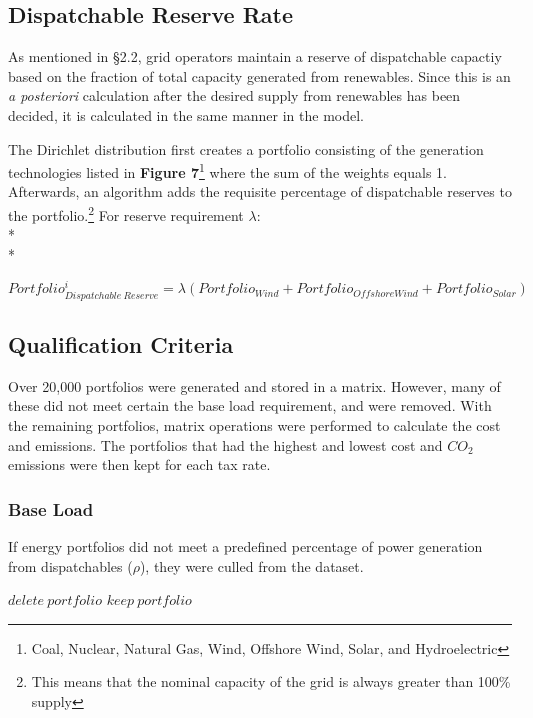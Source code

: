 \documentclass{article}
\begin{document}
\subsection{Dispatchable Reserve Rate}
As mentioned in \S{2.2}, grid operators maintain a reserve of dispatchable capactiy based on the fraction of total capacity generated from renewables. Since this is an \emph{a posteriori} calculation after the desired supply from renewables has been decided, it is calculated in the same manner in the model. \*

The Dirichlet distribution first creates a portfolio consisting of the generation technologies listed in {\bf Figure 7}\footnote{Coal, Nuclear, Natural Gas, Wind, Offshore Wind, Solar, and Hydroelectric} where the sum of the weights equals 1. Afterwards, an algorithm adds the requisite percentage of dispatchable reserves to the portfolio.\footnote{This means that the nominal capacity of the grid is always greater than 100\% supply} For reserve requirement $\lambda$: \\*\\*

\begin{algorithmic}
\STATE $Portfolio_{Dispatchable \: Reserve}^i = \lambda(Portfolio_{Wind} + Portfolio_{OffshoreWind} + Portfolio_{Solar})$
\ENDFOR
\end{algorithmic}

\subsection{Qualification Criteria}
Over 20,000 portfolios were generated and stored in a matrix. However, many of these did not meet certain the base load requirement, and were removed. With the remaining portfolios, matrix operations were performed 
to calculate the cost and emissions. The portfolios that had the highest and lowest cost and $CO_2$ emissions were then kept for each tax rate.

\subsubsection{Base Load}
If energy portfolios did not meet a predefined percentage of power generation from dispatchables ($\rho$), they were culled from the dataset. 
\begin{algorithmic}
		\STATE $delete \: portfolio$
	\ELSE
		\STATE $keep \: portfolio$
	\ENDIF
\end{algorithmic}
\end{document}

